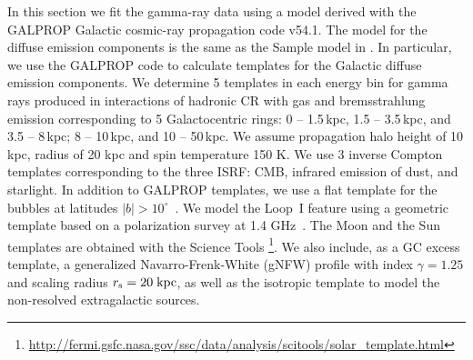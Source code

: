 In this section we fit the gamma-ray data using a model derived with the GALPROP
Galactic cosmic-ray propagation code v54.1.
The model for the diffuse emission components is the same as the Sample model in \cite{2017ApJ...840...43A}.
In particular, we use the GALPROP code to calculate templates for the Galactic diffuse emission components.
We determine 5 templates in each energy bin for gamma rays produced in 
interactions of hadronic CR with gas and bremsstrahlung emission corresponding to 5 Galactocentric rings: 
0 -- 1.5\,kpc, 1.5 -- 3.5\,kpc, and 3.5 -- 8\,kpc; 8 -- 10\,kpc, and 10 -- 50\,kpc.
We assume propagation halo height of 10 kpc, radius of 20 kpc and spin temperature 150 K.
We use 3 inverse Compton templates corresponding to the three ISRF: CMB, 
infrared emission of dust, and starlight.
In addition to GALPROP templates, we use a flat template for the \Fermi bubbles at latitudes $|b| > 10^\circ$~\citep{2014ApJ...793...64A}. 
We model the Loop~I feature using a geometric template \citep[e.g., Figure 2 of][]{2014ApJ...793...64A}
based on a polarization survey at 1.4 GHz~\citep{Wolleben:2007pq}.
The Moon and the Sun \citep{2007Ap&SS.309..359O, 2006ApJ...652L..65M, 2008A&A...480..847O, 2013arXiv1307.0197J} templates 
are obtained with the \Fermi Science Tools%
\footnote{\url{http://fermi.gsfc.nasa.gov/ssc/data/analysis/scitools/solar_template.html}}.
We also include, as a GC excess template, a generalized Navarro-Frenk-White (gNFW) profile with index $\gamma = 1.25$ 
\citep{Goodenough:2009gk,Abazajian:2014fta, Calore:2014xka}
and scaling radius $r_{\rm s} = 20\;{\rm kpc}$, as well as the isotropic template to model the non-resolved 
extragalactic sources.


